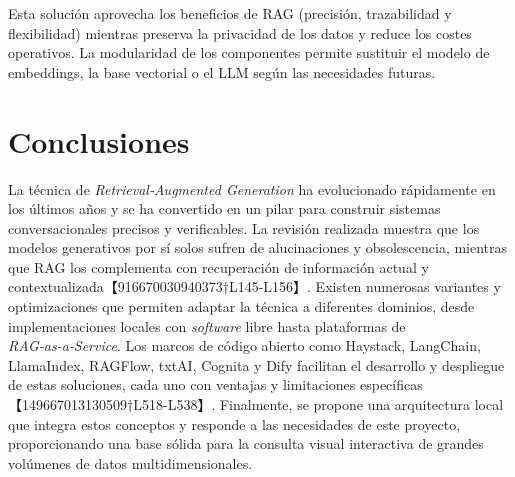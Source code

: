 Esta solución aprovecha los beneficios de RAG (precisión, trazabilidad y flexibilidad) mientras preserva la privacidad de los datos y reduce los costes operativos.  La modularidad de los componentes permite sustituir el modelo de embeddings, la base vectorial o el LLM según las necesidades futuras.

\section{Conclusiones}

La técnica de \textit{Retrieval‑Augmented Generation} ha evolucionado rápidamente en los últimos años y se ha convertido en un pilar para construir sistemas conversacionales precisos y verificables.  La revisión realizada muestra que los modelos generativos por sí solos sufren de alucinaciones y obsolescencia, mientras que RAG los complementa con recuperación de información actual y contextualizada【916670030940373†L145-L156】.  Existen numerosas variantes y optimizaciones que permiten adaptar la técnica a diferentes dominios, desde implementaciones locales con \textit{software} libre hasta plataformas de \textit{RAG‑as‑a‑Service}.  Los marcos de código abierto como Haystack, LangChain, LlamaIndex, RAGFlow, txtAI, Cognita y Dify facilitan el desarrollo y despliegue de estas soluciones, cada uno con ventajas y limitaciones específicas【149667013130509†L518-L538】.  Finalmente, se propone una arquitectura local que integra estos conceptos y responde a las necesidades de este proyecto, proporcionando una base sólida para la consulta visual interactiva de grandes volúmenes de datos multidimensionales.
